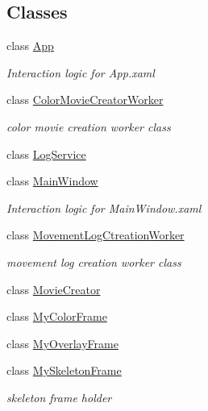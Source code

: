 \subsection*{Classes}
\begin{DoxyCompactItemize}
\item 
class \hyperlink{class_u_t_kinect_skeleton_movement_detector_1_1_app}{App}
\begin{DoxyCompactList}\small\item\em Interaction logic for App.\-xaml \end{DoxyCompactList}\item 
class \hyperlink{class_u_t_kinect_skeleton_movement_detector_1_1_color_movie_creator_worker}{Color\-Movie\-Creator\-Worker}
\begin{DoxyCompactList}\small\item\em color movie creation worker class \end{DoxyCompactList}\item 
class \hyperlink{class_u_t_kinect_skeleton_movement_detector_1_1_log_service}{Log\-Service}
\item 
class \hyperlink{class_u_t_kinect_skeleton_movement_detector_1_1_main_window}{Main\-Window}
\begin{DoxyCompactList}\small\item\em Interaction logic for Main\-Window.\-xaml \end{DoxyCompactList}\item 
class \hyperlink{class_u_t_kinect_skeleton_movement_detector_1_1_movement_log_ctreation_worker}{Movement\-Log\-Ctreation\-Worker}
\begin{DoxyCompactList}\small\item\em movement log creation worker class \end{DoxyCompactList}\item 
class \hyperlink{class_u_t_kinect_skeleton_movement_detector_1_1_movie_creator}{Movie\-Creator}
\item 
class \hyperlink{class_u_t_kinect_skeleton_movement_detector_1_1_my_color_frame}{My\-Color\-Frame}
\item 
class \hyperlink{class_u_t_kinect_skeleton_movement_detector_1_1_my_overlay_frame}{My\-Overlay\-Frame}
\item 
class \hyperlink{class_u_t_kinect_skeleton_movement_detector_1_1_my_skeleton_frame}{My\-Skeleton\-Frame}
\begin{DoxyCompactList}\small\item\em skeleton frame holder \end{DoxyCompactList}\item 

\end{DoxyCompactItemize}
